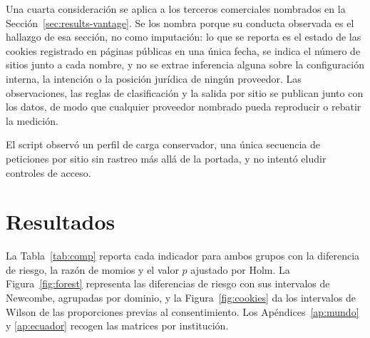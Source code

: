 \documentclass[pdflatex,sn-basic,Numbered,iicol]{sn-jnl}
\theoremstyle{thmstyleone}
\theoremstyle{thmstyletwo}
\theoremstyle{thmstylethree}
\begin{document}
Una cuarta consideraci\'on se aplica a los terceros comerciales nombrados en la Secci\'on~\ref{sec:results-vantage}. Se los nombra porque su conducta observada es el hallazgo de esa secci\'on, no como imputaci\'on: lo que se reporta es el estado de las cookies registrado en p\'aginas p\'ublicas en una \'unica fecha, se indica el n\'umero de sitios junto a cada nombre, y no se extrae inferencia alguna sobre la configuraci\'on interna, la intenci\'on o la posici\'on jur\'idica de ning\'un proveedor. Las observaciones, las reglas de clasificaci\'on y la salida por sitio se publican junto con los datos, de modo que cualquier proveedor nombrado pueda reproducir o rebatir la medici\'on.

El script observ\'o un perfil de carga conservador, una \'unica secuencia de peticiones por sitio sin rastreo m\'as all\'a de la portada, y no intent\'o eludir controles de acceso.

\section{Resultados}\label{sec:results}

La Tabla~\ref{tab:comp} reporta cada indicador para ambos grupos con la diferencia de riesgo, la raz\'on de momios y el valor $p$ ajustado por Holm. La Figura~\ref{fig:forest} representa las diferencias de riesgo con sus intervalos de Newcombe, agrupadas por dominio, y la Figura~\ref{fig:cookies} da los intervalos de Wilson de las proporciones previas al consentimiento. Los Ap\'endices~\ref{ap:mundo} y \ref{ap:ecuador} recogen las matrices por instituci\'on.
\end{document}
